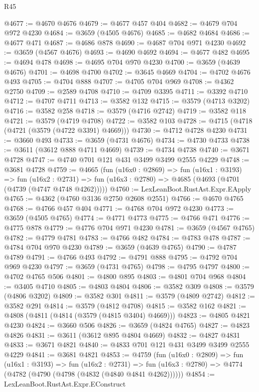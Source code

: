\begin{lexlean}{R45}
\begin{coremodule}
@4677 := @4670 @4676
@4679 := @4677 @457 @404
@4682 := @4679 @704 @972 @4230
@4684 := @3659 (@4505 @4676)
@4685 := @4682 @4684
@4686 := @4677 @471
@4687 := @4686 @878
@4690 := @4687 @704 @971 @4230
@4692 := @3659 (@4567 @4676)
@4693 := @4690 @4692
@4694 := @4677 @482
@4695 := @4694 @478
@4698 := @4695 @704 @970 @4230
@4700 := @3659 (@4639 @4676)
@4701 := @4698 @4700
@4702 := @3645 @4669
@4704 := @4702 @4676 @493
@4705 := @4704 @888
@4707 := @4705 @704 @969
@4708 := @4362 @2750
@4709 := @2589 @4708
@4710 := @4709 @3395
@4711 := @3392 @4710
@4712 := @4707 @4711
@4713 := @3582 @132
@4715 := @3579 (@4713 @3202)
@4716 := @3582 @258
@4718 := @3579 (@4716 @2742)
@4719 := @3582 @118
@4721 := @3579 (@4719 @4708)
@4722 := @3582 @103
@4728 := @4715 (@4718 (@4721 (@3579 (@4722 @3391) @4669)))
@4730 := @4712 @4728 @4230
@4731 := @3660 @493
@4733 := @3659 (@4731 @4676)
@4734 := @4730 @4733
@4738 := @3611 (@3612 @888 @4711 @4669)
@4739 := @4734 @4738
@4740 := @3671 @4728
@4747 := @4740 @701 @121 @431 @3499 @3499 @2555 @4229
@4748 := @3681 @4728
@4759 := @4665
    (fun (u16x0 : @2869) =>
    fun (u16x1 : @3193) =>
    fun (u16x2 : @2731) => fun (u16x3 : @2780) => @4685 (@4693 (@4701 (@4739 (@4747 @4748 @4262)))))
@4760 := LexLeanBoot.RustAst.Expr.EApply
@4765 := @4362 (@4760 @3136 @2750 @2608 @2551)
@4766 := @4670 @4765
@4768 := @4766 @457 @404
@4771 := @4768 @704 @972 @4230
@4773 := @3659 (@4505 @4765)
@4774 := @4771 @4773
@4775 := @4766 @471
@4776 := @4775 @878
@4779 := @4776 @704 @971 @4230
@4781 := @3659 (@4567 @4765)
@4782 := @4779 @4781
@4783 := @4766 @482
@4784 := @4783 @478
@4787 := @4784 @704 @970 @4230
@4789 := @3659 (@4639 @4765)
@4790 := @4787 @4789
@4791 := @4766 @493
@4792 := @4791 @888
@4795 := @4792 @704 @969 @4230
@4797 := @3659 (@4731 @4765)
@4798 := @4795 @4797
@4800 := @4702 @4765 @506
@4801 := @4800 @895
@4803 := @4801 @704 @968
@4804 := @3405 @4710
@4805 := @4803 @4804
@4806 := @3582 @309
@4808 := @3579 (@4806 @3202)
@4809 := @3582 @301
@4811 := @3579 (@4809 @2742)
@4812 := @3582 @291
@4814 := @3579 (@4812 @4708)
@4815 := @3582 @162
@4821 := @4808 (@4811 (@4814 (@3579 (@4815 @3404) @4669)))
@4823 := @4805 @4821 @4230
@4824 := @3660 @506
@4826 := @3659 (@4824 @4765)
@4827 := @4823 @4826
@4831 := @3611 (@3612 @895 @4804 @4669)
@4832 := @4827 @4831
@4833 := @3671 @4821
@4840 := @4833 @701 @121 @431 @3499 @3499 @2555 @4229
@4841 := @3681 @4821
@4853 := @4759
    (fun (u16x0 : @2809) =>
    fun (u16x1 : @3193) =>
    fun (u16x2 : @2731) =>
    fun (u16x3 : @2780) => @4774 (@4782 (@4790 (@4798 (@4832 (@4840 @4841 @4262))))))
@4854 := LexLeanBoot.RustAst.Expr.EConstruct

\end{coremodule}
\end{lexlean}
